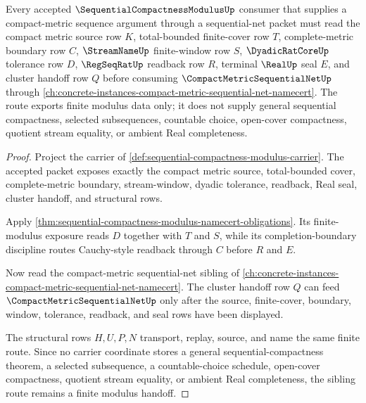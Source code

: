 \begin{theorem}
\label{thm:sequential-compactness-modulus-compact-metric-sequential-net-route}
Every accepted $\SequentialCompactnessModulusUp$ consumer that supplies a compact-metric sequence argument through a sequential-net packet must read the compact metric source row $K$, total-bounded finite-cover row $T$, complete-metric boundary row $C$, $\StreamNameUp$ finite-window row $S$, $\DyadicRatCoreUp$ tolerance row $D$, $\RegSeqRatUp$ readback row $R$, terminal $\RealUp$ seal $E$, and cluster handoff row $Q$ before consuming $\CompactMetricSequentialNetUp$ through \autoref{ch:concrete-instances-compact-metric-sequential-net-namecert}. The route exports finite modulus data only; it does not supply general sequential compactness, selected subsequences, countable choice, open-cover compactness, quotient stream equality, or ambient Real completeness.
\end{theorem}
\begin{proof}
Project the carrier of \autoref{def:sequential-compactness-modulus-carrier}. The accepted packet exposes exactly the compact metric source, total-bounded cover, complete-metric boundary, stream-window, dyadic tolerance, readback, Real seal, cluster handoff, and structural rows.

Apply \autoref{thm:sequential-compactness-modulus-namecert-obligations}. Its finite-modulus exposure reads $D$ together with $T$ and $S$, while its completion-boundary discipline routes Cauchy-style readback through $C$ before $R$ and $E$.

Now read the compact-metric sequential-net sibling of \autoref{ch:concrete-instances-compact-metric-sequential-net-namecert}. The cluster handoff row $Q$ can feed $\CompactMetricSequentialNetUp$ only after the source, finite-cover, boundary, window, tolerance, readback, and seal rows have been displayed.

The structural rows $H,U,P,N$ transport, replay, source, and name the same finite route. Since no carrier coordinate stores a general sequential-compactness theorem, a selected subsequence, a countable-choice schedule, open-cover compactness, quotient stream equality, or ambient Real completeness, the sibling route remains a finite modulus handoff.
\end{proof}


